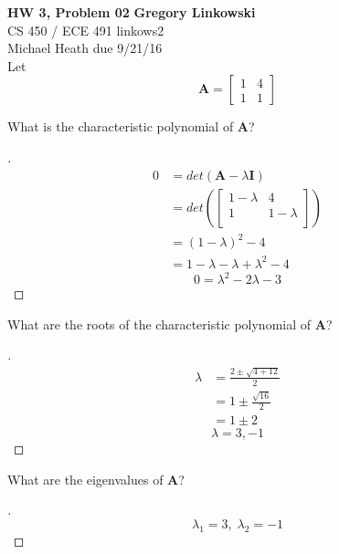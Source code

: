 \documentclass[12pt]{article}
\newenvironment{exercise}[2][Exercise]{\begin{trivlist}
\item[\hskip \labelsep {\bfseries #1}\hskip \labelsep {\bfseries #2.}]}{\end{trivlist}}
\begin{document}
\noindent
\large\textbf{HW 3, Problem 02} \hfill \textbf{Gregory Linkowski} \\
\normalsize CS 450 / ECE 491 \hfill linkows2 \\
Michael Heath \hfill due 9/21/16 \\



\vspace{5mm}
Let	\[ \bm{A}=\begin{bmatrix}	1 & 4 \\ 1 & 1	\end{bmatrix}	\]  
\vspace{5mm}

\begin{exercise}{1}
	What is the characteristic polynomial of $\bm{A}$?
\end{exercise}
\begin{proof}[]
	\vspace{-8mm}
	\begin{align*}
		0 &= det(\bm{A} - \lambda \bm{I}) \\
		&= det\left( \begin{bmatrix} 1-\lambda & 4 \\ 1 & 1-\lambda \\ \end{bmatrix} \right) \\
		&= (1-\lambda)^2 - 4 \\
		&= 1 - \lambda - \lambda + \lambda^2 - 4
	\end{align*}
	\[\boxed{ 0 = \lambda^2 - 2 \lambda - 3 }\] 
\end{proof}

\begin{exercise}{2}
	What are the roots of the characteristic polynomial of $\bm{A}$?
\end{exercise}
\begin{proof}[]
	\vspace{-8mm}
	\begin{align*}
		\lambda &= \frac{2 \pm \sqrt{4 + 12}}{2} \\
		&= 1 \pm \frac{\sqrt{16}}{2} \\
		&= 1 \pm 2 
	\end{align*}
	\[\boxed{ \lambda = 3, -1 }\] 
\end{proof}
\begin{exercise}{3}
	What are the eigenvalues of $\bm{A}$?
\end{exercise}
\begin{proof}[]
	\[\boxed{ \lambda_1 = 3, \; \lambda_2 = -1 }\] 	
\end{proof}
\end{document}
